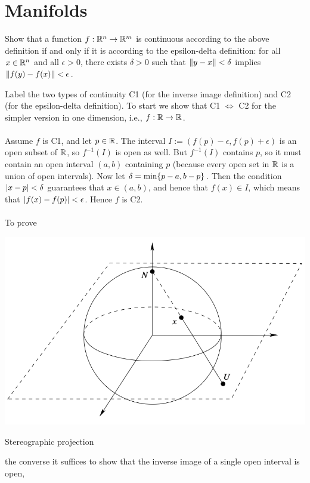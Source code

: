 \documentclass[10pt]{article}
\begin{document}
\newpage
\section{Manifolds}\label{b1c2}



\begin{example}
	Show that a function $f : \mathbb{R}^n \to \mathbb{R}^m$ is continuous according to the above
	definition if and only if it is according to the epsilon-delta definition:
	 for all $x \in \mathbb{R}^n$ and all $\epsilon > 0$, there exists $\delta > 0$
	 such that $\norm{y-x} < \delta$ implies $\norm{f(y) - f(x)} < \epsilon$.
\end{example}
\sol Label the two types of continuity C1 (for the inverse image definition)
 and C2 (for the epsilon-delta definition). To start we show that C1 $\iff$ C2
 for the simpler version in one dimension, i.e., $f:\mathbb{R}\to\mathbb{R}$.\\\\
  Assume $f$ is C1, and let $p \in \mathbb{R}$.
 The interval $I := (f(p)-\epsilon, f(p)+\epsilon)$ is an open subset of $\mathbb{R}$, so
  $f^{-1}(I)$ is open as well.
 But $f^{-1}(I)$ contains $p$, so it must contain an open interval $(a, b)$ containing $p$
 (because every open set in $\mathbb{R}$ is a union of open intervals). Now let $\delta = \min\lbrace p - a,b - p\rbrace$.
 Then the condition $\abs{x - p} < \delta$ guarantees that $x \in (a,b)$, and hence that $f(x)\in I$, which means that $\abs{f(x)- f(p)}<\epsilon$.
 Hence $f$ is C2.\\\\
To prove \begin{marginfigure}
	\begin{center}
	  \includegraphics[width=1.2\textwidth]{figs/stereo.png}
	\end{center}
	\caption{Stereographic projection}
\end{marginfigure}the converse it suffices to show that the inverse image of a single open interval is open,
\end{document}
